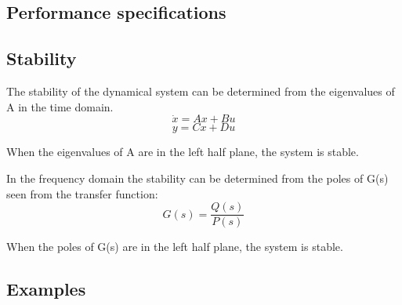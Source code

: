 \subsection{Performance specifications}
\subsection{Stability}
The stability of the dynamical system can be determined from the eigenvalues of A in the time domain.
$$\dot{x} = Ax+Bu$$
$$y=Cx+Du$$

When the eigenvalues of A are in the left half plane, the system is stable.


In the frequency domain the stability can be determined from the poles of G(s) seen from the transfer function:
$$G(s) = \frac{Q(s)}{P(s)}$$

When the poles of G(s) are in the left half plane, the system is stable.



\subsection{Examples}
